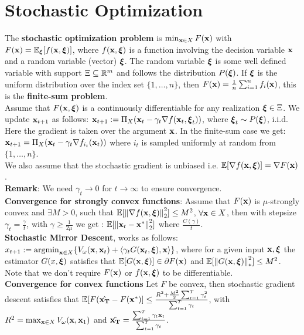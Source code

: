 \section{Stochastic Optimization}
The \textbf{stochastic optimization problem} is $\min_{\mathbf{x} \in X}{F(\mathbf{x})}$ with $F(\mathbf{x}) = \mathbb{E}_{\boldsymbol{\xi}}[f(\mathbf{x}, \boldsymbol{\xi})]$, where $f(\mathbf{x}, \boldsymbol{\xi})$ is a function involving the decision variable $\mathbf{x}$ and a random variable (vector) $\boldsymbol{\xi}$. The random variable $\boldsymbol{\xi}$ is some well defined variable with support $\Xi \subseteq \mathbb{R}^m$ and follows the distribution $P(\boldsymbol{\xi})$. If $\boldsymbol{\xi}$ is the uniform distribution over the index set $\{1, \dots, n\}$, then $F(\mathbf{x}) = \frac{1}{n}\sum_{i=1}^n{f_i(\mathbf{x})}$, this is the \textbf{finite-sum problem}. \\
Assume that $F(\mathbf{x}, \boldsymbol{\xi})$ is a continuously differentiable for any realization $\boldsymbol{\xi} \in \Xi$. We update $\mathbf{x}_{t+1}$ as follows: $\mathbf{x}_{t+1} := \Pi_X(\mathbf{x}_t - \gamma_t \nabla f(\mathbf{x}_t, \boldsymbol{\xi}_t))$, where $\boldsymbol{\xi}_t \sim P(\boldsymbol{\xi})$, i.i.d. Here the gradient is taken over the argument $\mathbf{x}$. In the finite-sum case we get: $\mathbf{x}_{t+1} = \Pi_X(\mathbf{x}_t - \gamma_t \nabla f_{i_t}(\mathbf{x}_t))$ where $i_t$ is sampled uniformly at random from $\{1, \dots, n\}$. \\
We also assume that the stochastic gradient is unbiased i.e. $\mathbb{E}[\nabla f(\mathbf{x}, \boldsymbol{\xi})] = \nabla F(\mathbf{x})$. \\
\textbf{Remark}: We need $\gamma_t \rightarrow 0$ for $t \rightarrow \infty$ to ensure convergence. \\
\textbf{Convergence for strongly convex functions}: Assume that $F(\mathbf{x})$ is $\mu$-strongly convex and $\exists M > 0$, such that $\mathbb{E}[\norm{\nabla f(\mathbf{x}, \boldsymbol{\xi})}_2^2] \leq M^2$, $\forall \mathbf{x} \in X$, then with stepsize $\gamma_t = \frac{\gamma}{t}$, with $\gamma \geq \frac{1}{2\mu}$ we get : $\mathbb{E}[\norm{\mathbf{x}_t - \mathbf{x}^*}_2^2]$ where $\frac{C(\gamma)}{t}$. \\
\textbf{Stochastic Mirror Descent}, works as follows: $x_{t+1} := \mathrm{argmin}_{\mathbf{x} \in X} \{V_{\omega}(\mathbf{x}, \mathbf{x}_t) + \langle \gamma_t G(\mathbf{x}_t, \boldsymbol{\xi}), \mathbf{x} \rangle\}$, where for a given input $\mathbf{x}, \boldsymbol{\xi}$ the estimator $G(x, \boldsymbol{\xi})$ satisfies that $\mathbb{E}[G(\mathbf{x}, \boldsymbol{\xi})] \in \partial F(\mathbf{x})$ and $\mathbb{E}[\norm{G(\mathbf{x}, \boldsymbol{\xi})}_*^2] \leq M^2$. Note that we don't require $F(\mathbf{x})$ or $f(\mathbf{x}, \boldsymbol{\xi})$ to be differentiable. \\
\textbf{Convergence for convex functions} Let $F$ be convex, then stochastic gradient descent satisfies that $\mathbb{E}[F(\hat{\mathbf{x}_T} - F(\mathbf{x}^*)] \leq \frac{R^2 + \frac{M^2}{2}\sum_{t=1}^T{\gamma_t^2}}{\sum_{t=1}^T{\gamma_t}}$, with $R^2 = \max_{\mathbf{x} \in X}{V_{\omega}(\mathbf{x}, \mathbf{x}_1)}$ and $\hat{\mathbf{x}_T}=\frac{\sum_{t=1}^T{\gamma_t \mathbf{x}_t}}{\sum_{t=1}^T{\gamma_t}}$.\\
